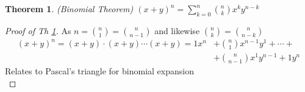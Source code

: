 \documentclass[12pt]{article}
\renewcommand{\_}[1]{\underline{ #1 }}
\newtheorem{theorem}{Theorem}[section]
\theoremstyle{definition}
\numberwithin{equation}{subsection}
\begin{document}
\begin{theorem}\label{binomial}
(Binomial Theorem) $\displaystyle(x+y)^n=\sum_{k=0}^n {n \choose k}x^ky^{n-k}$
\end{theorem}

\begin{proof}[Proof of Th \ref{binomial}]
    As $n={n\choose 1}={n\choose n-1}$ and likewise ${n\choose k}={n\choose n-k}$
    \begin{align*}
        (x+y)^n=(x+y)\cdot (x+y)\cdots (x+y)=1x^n
            &+{n\choose 1}x^{n-1}y^1+\cdots + \\
            &+{n\choose n - 1}x^1y^{n-1} + 1y^n
    \end{align*}
    Relates to Pascal's triangle for binomial expansion \\
\end{proof}
\end{document}
